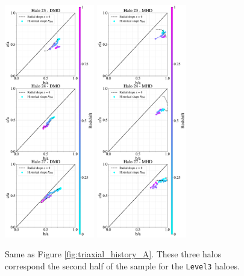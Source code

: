 \documentclass[a4paper,fleqn,usenatbib]{mnras}
\begin{document}
\begin{figure}
\begin{center}
\includegraphics[width=0.35\textwidth]{Z_Triax_level3_set_B_DM.pdf}
\includegraphics[width=0.35\textwidth]{Z_Triax_level3_set_B_MHD.pdf}
\end{center}
\caption{Same as Figure \ref{fig:triaxial_history_A}.
  These three halos correspond the second half of the sample for the
  \texttt{Level3} haloes. 
}
\label{fig:triaxial_history_B}
\end{figure}
\end{document}
